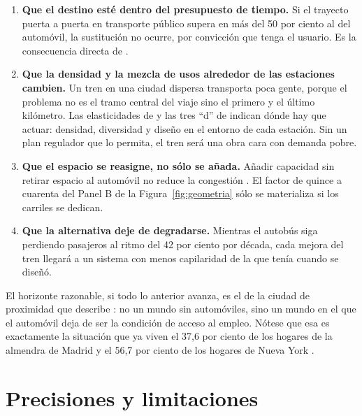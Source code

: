 \documentclass[11pt,letterpaper]{article}
\begin{document}
\begin{enumerate}
  \item \textbf{Que el destino esté dentro del presupuesto de tiempo.} Si el
    trayecto puerta a puerta en transporte público supera en más del 50 por
    ciento al del automóvil, la sustitución no ocurre, por convicción que
    tenga el usuario. Es la consecuencia directa de
    \textcite{zahavi1974,marchetti1994}.
  \item \textbf{Que la densidad y la mezcla de usos alrededor de las
    estaciones cambien.} Un tren en una ciudad dispersa transporta poca gente,
    porque el problema no es el tramo central del viaje sino el primero y el
    último kilómetro. Las elasticidades de \textcite{ewing2010} y las tres
    \enquote{d} de \textcite{cervero1997} indican dónde hay que actuar:
    densidad, diversidad y diseño en el entorno de cada estación. Sin un plan
    regulador que lo permita, el tren será una obra cara con demanda pobre.
  \item \textbf{Que el espacio se reasigne, no sólo se añada.} Añadir capacidad
    sin retirar espacio al automóvil no reduce la congestión
    \parencite{duranton2011}. El factor de quince a cuarenta del Panel B de la
    Figura~\ref{fig:geometria} sólo se materializa si los carriles se dedican.
  \item \textbf{Que la alternativa deje de degradarse.} Mientras el autobús
    siga perdiendo pasajeros al ritmo del 42 por ciento por década, cada mejora
    del tren llegará a un sistema con menos capilaridad de la que tenía cuando
    se diseñó.
\end{enumerate}

El horizonte razonable, si todo lo anterior avanza, es el de la ciudad de
proximidad que describe \textcite{moreno2021}: no un mundo sin automóviles,
sino un mundo en el que el automóvil deja de ser la condición de acceso al
empleo. Nótese que esa es exactamente la situación que ya viven el 37,6 por
ciento de los hogares de la almendra de Madrid y el 56,7 por ciento de los
hogares de Nueva York \parencite{crtm2019,acs2024}.

\section{Precisiones y limitaciones}
\end{document}
